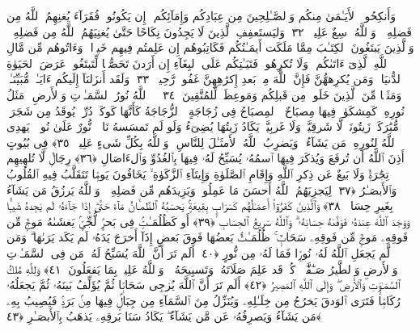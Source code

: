  وَأَنكِحُوا۟ ٱلأَيَـٰمَىٰ مِنكُم وَٱلصَّـٰلِحِينَ مِن عِبَادِكُم وَإِمَآئِكُم ۚ إِن يَكُونُوا۟ فُقَرَآءَ يُغنِهِمُ ٱللَّهُ مِن فَضلِهِۦ ۗ وَٱللَّهُ وَٟسِعٌ عَلِيمٌۭ ﴿٣٢﴾
 وَليَستَعفِفِ ٱلَّذِينَ لَا يَجِدُونَ نِكَاحًا حَتَّىٰ يُغنِيَهُمُ ٱللَّهُ مِن فَضلِهِۦ ۗ وَٱلَّذِينَ يَبتَغُونَ ٱلكِتَـٰبَ مِمَّا مَلَكَت أَيمَـٰنُكُم فَكَاتِبُوهُم إِن عَلِمتُم فِيهِم خَيرًۭا ۖ وَءَاتُوهُم مِّن مَّالِ ٱللَّهِ ٱلَّذِىٓ ءَاتَىٰكُم ۚ وَلَا تُكرِهُوا۟ فَتَيَـٰتِكُم عَلَى ٱلبِغَآءِ إِن أَرَدنَ تَحَصُّنًۭا لِّتَبتَغُوا۟ عَرَضَ ٱلحَيَوٰةِ ٱلدُّنيَا ۚ وَمَن يُكرِههُّنَّ فَإِنَّ ٱللَّهَ مِنۢ بَعدِ إِكرَٰهِهِنَّ غَفُورٌۭ رَّحِيمٌۭ ﴿٣٣﴾
 وَلَقَد أَنزَلنَآ إِلَيكُم ءَايَـٰتٍۢ مُّبَيِّنَـٰتٍۢ وَمَثَلًۭا مِّنَ ٱلَّذِينَ خَلَوا۟ مِن قَبلِكُم وَمَوعِظَةًۭ لِّلمُتَّقِينَ ﴿٣٤﴾
 ۞ ٱللَّهُ نُورُ ٱلسَّمَـٰوَٟتِ وَٱلأَرضِ ۚ مَثَلُ نُورِهِۦ كَمِشكَوٰةٍۢ فِيهَا مِصبَاحٌ ۖ ٱلمِصبَاحُ فِى زُجَاجَةٍ ۖ ٱلزُّجَاجَةُ كَأَنَّهَا كَوكَبٌۭ دُرِّىٌّۭ يُوقَدُ مِن شَجَرَةٍۢ مُّبَٰرَكَةٍۢ زَيتُونَةٍۢ لَّا شَرقِيَّةٍۢ وَلَا غَربِيَّةٍۢ يَكَادُ زَيتُهَا يُضِىٓءُ وَلَو لَم تَمسَسهُ نَارٌۭ ۚ نُّورٌ عَلَىٰ نُورٍۢ ۗ يَهدِى ٱللَّهُ لِنُورِهِۦ مَن يَشَآءُ ۚ وَيَضرِبُ ٱللَّهُ ٱلأَمثَـٰلَ لِلنَّاسِ ۗ وَٱللَّهُ بِكُلِّ شَىءٍ عَلِيمٌۭ ﴿٣٥﴾
 فِى بُيُوتٍ أَذِنَ ٱللَّهُ أَن تُرفَعَ وَيُذكَرَ فِيهَا ٱسمُهُۥ يُسَبِّحُ لَهُۥ فِيهَا بِٱلغُدُوِّ وَٱلءَاصَالِ ﴿٣٦﴾
 رِجَالٌۭ لَّا تُلهِيهِم تِجَٰرَةٌۭ وَلَا بَيعٌ عَن ذِكرِ ٱللَّهِ وَإِقَامِ ٱلصَّلَوٰةِ وَإِيتَآءِ ٱلزَّكَوٰةِ ۙ يَخَافُونَ يَومًۭا تَتَقَلَّبُ فِيهِ ٱلقُلُوبُ وَٱلأَبصَـٰرُ ﴿٣٧﴾
 لِيَجزِيَهُمُ ٱللَّهُ أَحسَنَ مَا عَمِلُوا۟ وَيَزِيدَهُم مِّن فَضلِهِۦ ۗ وَٱللَّهُ يَرزُقُ مَن يَشَآءُ بِغَيرِ حِسَابٍۢ ﴿٣٨﴾
 وَٱلَّذِينَ كَفَرُوٓا۟ أَعمَـٰلُهُم كَسَرَابٍۭ بِقِيعَةٍۢ يَحسَبُهُ ٱلظَّمـَٔانُ مَآءً حَتَّىٰٓ إِذَا جَآءَهُۥ لَم يَجِدهُ شَيـًۭٔا وَوَجَدَ ٱللَّهَ عِندَهُۥ فَوَفَّىٰهُ حِسَابَهُۥ ۗ وَٱللَّهُ سَرِيعُ ٱلحِسَابِ ﴿٣٩﴾
 أَو كَظُلُمَـٰتٍۢ فِى بَحرٍۢ لُّجِّىٍّۢ يَغشَىٰهُ مَوجٌۭ مِّن فَوقِهِۦ مَوجٌۭ مِّن فَوقِهِۦ سَحَابٌۭ ۚ ظُلُمَـٰتٌۢ بَعضُهَا فَوقَ بَعضٍ إِذَآ أَخرَجَ يَدَهُۥ لَم يَكَد يَرَىٰهَا ۗ وَمَن لَّم يَجعَلِ ٱللَّهُ لَهُۥ نُورًۭا فَمَا لَهُۥ مِن نُّورٍ ﴿٤٠﴾
 أَلَم تَرَ أَنَّ ٱللَّهَ يُسَبِّحُ لَهُۥ مَن فِى ٱلسَّمَـٰوَٟتِ وَٱلأَرضِ وَٱلطَّيرُ صَـٰٓفَّٰتٍۢ ۖ كُلٌّۭ قَد عَلِمَ صَلَاتَهُۥ وَتَسبِيحَهُۥ ۗ وَٱللَّهُ عَلِيمٌۢ بِمَا يَفعَلُونَ ﴿٤١﴾
 وَلِلَّهِ مُلكُ ٱلسَّمَـٰوَٟتِ وَٱلأَرضِ ۖ وَإِلَى ٱللَّهِ ٱلمَصِيرُ ﴿٤٢﴾
 أَلَم تَرَ أَنَّ ٱللَّهَ يُزجِى سَحَابًۭا ثُمَّ يُؤَلِّفُ بَينَهُۥ ثُمَّ يَجعَلُهُۥ رُكَامًۭا فَتَرَى ٱلوَدقَ يَخرُجُ مِن خِلَـٰلِهِۦ وَيُنَزِّلُ مِنَ ٱلسَّمَآءِ مِن جِبَالٍۢ فِيهَا مِنۢ بَرَدٍۢ فَيُصِيبُ بِهِۦ مَن يَشَآءُ وَيَصرِفُهُۥ عَن مَّن يَشَآءُ ۖ يَكَادُ سَنَا بَرقِهِۦ يَذهَبُ بِٱلأَبصَـٰرِ ﴿٤٣﴾
